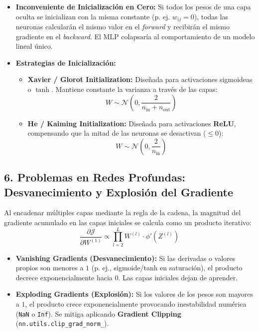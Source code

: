 \begin{itemize}
	\item \textbf{Inconveniente de Inicialización en Cero:} Si todos los pesos de una capa oculta se inicializan con la misma constante (p. ej. $w_{ij} = 0$), todas las neuronas calcularán el mismo valor en el \emph{forward} y recibirán el mismo gradiente en el \emph{backward}. El MLP colapsaría al comportamiento de un modelo lineal único.
	
	\item \textbf{Estrategias de Inicialización:}
	\begin{itemize}
		\item \textbf{Xavier / Glorot Initialization:} Diseñada para activaciones sigmoideas o $\tanh$. Mantiene constante la varianza a través de las capas:
		$$W \sim \mathcal{N}\left(0, \frac{2}{n_{\text{in}} + n_{\text{out}}}\right)$$
		\item \textbf{He / Kaiming Initialization:} Diseñada para activaciones \textbf{ReLU}, compensando que la mitad de las neuronas se desactivan ($\le 0$):
		$$W \sim \mathcal{N}\left(0, \frac{2}{n_{\text{in}}}\right)$$
	\end{itemize}
\end{itemize}

\subsection{6. Problemas en Redes Profundas: Desvanecimiento y Explosión del Gradiente}

Al encadenar múltiples capas mediante la regla de la cadena, la magnitud del gradiente acumulado en las capas iniciales se calcula como un producto iterativo:
$$\frac{\partial \mathcal{J}}{\partial W^{(1)}} \propto \prod_{l=2}^{L} W^{(l)} \cdot \phi'(Z^{(l)})$$

\begin{itemize}
	\item \textbf{Vanishing Gradients (Desvanecimiento):} Si las derivadas o valores propios son menores a $1$ (p. ej., sigmoide/tanh en saturación), el producto decrece exponencialmente hacia $0$. Las capas iniciales dejan de aprender.
	\item \textbf{Exploding Gradients (Explosión):} Si los valores de los pesos son mayores a $1$, el producto crece exponencialmente provocando inestabilidad numérica (\texttt{NaN} o \texttt{Inf}). Se mitiga aplicando \textbf{Gradient Clipping} (\texttt{nn.utils.clip\_grad\_norm\_}).
\end{itemize}

